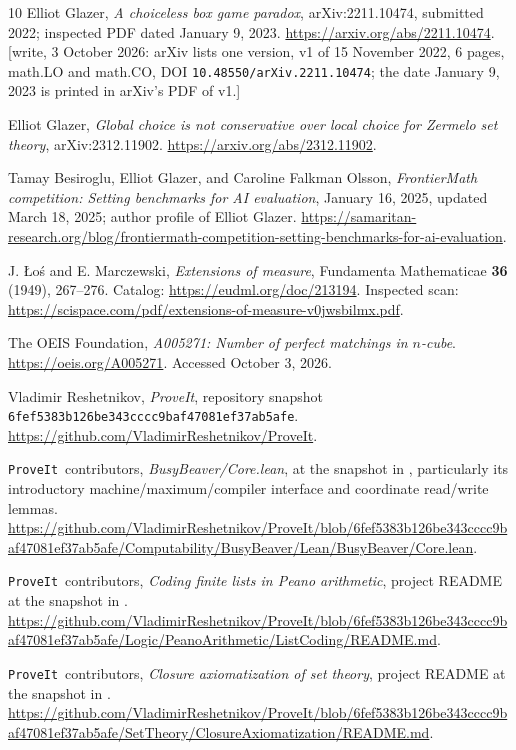 \documentclass[11pt,letterpaper]{article}
\theoremstyle{definition}
\newcommand{\repo}{\texttt{ProveIt}}
\newcommand{\commit}{\nolinkurl{6fef5383b126be343cccc9baf47081ef37ab5afe}}
\begin{document}
\clearpage
{}
\begin{thebibliography}{10}
Elliot Glazer, \emph{A choiceless box game paradox}, arXiv:2211.10474, submitted 2022; inspected PDF dated January 9, 2023. \url{https://arxiv.org/abs/2211.10474}.
{\small[write, 3 October 2026: arXiv lists one version, v1 of 15 November 2022, 6 pages, math.LO and math.CO, DOI \nolinkurl{10.48550/arXiv.2211.10474}; the date January 9, 2023 is printed in arXiv's PDF of v1.]}

Elliot Glazer, \emph{Global choice is not conservative over local choice for Zermelo set theory}, arXiv:2312.11902. \url{https://arxiv.org/abs/2312.11902}.

Tamay Besiroglu, Elliot Glazer, and Caroline Falkman Olsson,
\emph{FrontierMath competition: Setting benchmarks for AI evaluation}, January 16, 2025, updated March 18, 2025; author profile of Elliot Glazer.
\url{https://samaritan-research.org/blog/frontiermath-competition-setting-benchmarks-for-ai-evaluation}.

J. \L o\'s and E. Marczewski, \emph{Extensions of measure}, Fundamenta Mathematicae \textbf{36} (1949), 267--276.
Catalog: \url{https://eudml.org/doc/213194}.
Inspected scan: \url{https://scispace.com/pdf/extensions-of-measure-v0jwsbilmx.pdf}.

The OEIS Foundation, \emph{A005271: Number of perfect matchings in $n$-cube}. \url{https://oeis.org/A005271}. Accessed October 3, 2026.

Vladimir Reshetnikov, \emph{ProveIt}, repository snapshot \commit.
\url{https://github.com/VladimirReshetnikov/ProveIt}.

\repo\ contributors, \emph{BusyBeaver/Core.lean}, at the snapshot in \cite{ProveIt}, particularly its introductory machine/maximum/compiler interface and coordinate read/write lemmas.
\url{https://github.com/VladimirReshetnikov/ProveIt/blob/6fef5383b126be343cccc9baf47081ef37ab5afe/Computability/BusyBeaver/Lean/BusyBeaver/Core.lean}.

\repo\ contributors, \emph{Coding finite lists in Peano arithmetic}, project README at the snapshot in \cite{ProveIt}.
\url{https://github.com/VladimirReshetnikov/ProveIt/blob/6fef5383b126be343cccc9baf47081ef37ab5afe/Logic/PeanoArithmetic/ListCoding/README.md}.

\repo\ contributors, \emph{Closure axiomatization of set theory}, project README at the snapshot in \cite{ProveIt}.
\url{https://github.com/VladimirReshetnikov/ProveIt/blob/6fef5383b126be343cccc9baf47081ef37ab5afe/SetTheory/ClosureAxiomatization/README.md}.


\end{thebibliography}
\end{document}
